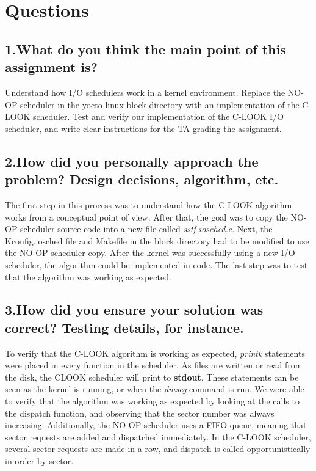 \documentclass[letterpaper,10pt,fleqn]{article}
\begin{document}
	\section*{Questions}
	\subsection*{1.What do you think the main point of this assignment is?}
	Understand how I/O schedulers work in a kernel environment.
	Replace the NO-OP scheduler in the yocto-linux block directory with an implementation of the C-LOOK scheduler.
	Test and verify our implementation of the C-LOOK I/O scheduler, and write clear instructions for the TA grading the assignment.

	\subsection*{2.How did you personally approach the problem? Design decisions, algorithm, etc.}
	The first step in this process was to understand how the C-LOOK algorithm works from a conceptual point of view.
	After that, the goal was to copy the NO-OP scheduler source code into a new file called \textit{sstf-iosched.c}.
	Next, the Kconfig.iosched file and Makefile in the block directory had to be modified to use the NO-OP scheduler copy.
	After the kernel was successfully using a new I/O scheduler, the algorithm could be implemented in code.
	The last step was to test that the algorithm was working as expected.

	\subsection*{3.How did you ensure your solution was correct? Testing details, for instance.}
	To verify that the C-LOOK algorithm is working as expected, \textit{printk} statements were placed in every function in the scheduler.
	As files are written or read from the disk, the CLOOK scheduler will print to \textbf{stdout}.
	These statements can be seen as the kernel is running, or when the \textit {dmseg} command is run.
	We were able to verify that the algorithm was working as expected by looking at the calls to the dispatch function, and observing that the sector number was always increasing.
	Additionally, the NO-OP scheduler uses a FIFO queue, meaning that sector requests are added and dispatched immediately.
	In the C-LOOK scheduler, several sector requests are made in a row, and dispatch is called opportunistically in order by sector.
\end{document}
